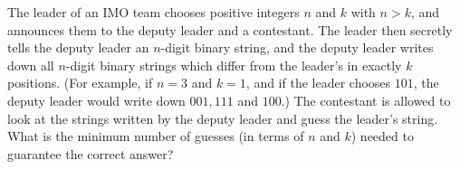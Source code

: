 The leader of an IMO team chooses positive integers 
$n$
 and 
$k$
 with 
$n > k$, 
 and announces them to the deputy leader and a contestant. The leader then secretly tells the deputy leader an 
$n$-digit binary string, and the deputy leader writes down all 
$n$-digit binary strings which differ from the leader’s in exactly 
$k$
 positions. (For example, if 
$n = 3$
 and 
$k = 1$, 
 and if the leader chooses 
$101$, 
 the deputy leader would write down 
$001, 111$
 and 
$100$.)
The contestant is allowed to look at the strings written by the deputy leader and guess the leader’s string. What is the minimum number of guesses (in terms of 
$n$
 and 
$k$)
 needed to guarantee the correct answer?
